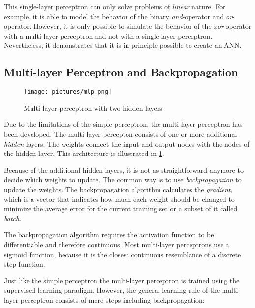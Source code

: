 This single-layer perceptron can only solve problems of \textit{linear} nature. For example, it is able to model the behavior of the binary \textit{and}-operator and \textit{or}-operator. However, it is only possible to simulate the behavior of the \textit{xor} operator with a multi-layer perceptron and not with a single-layer perceptron. Nevertheless, it demonstrates that it is in principle possible to create an \ac{ANN}.
\cite{haykin2009neural}

\subsection*{Multi-layer Perceptron and Backpropagation}
\begin{figure}[ht]
    \centering 
    \texttt{[image: pictures/mlp.png]}
    \caption{Multi-layer perceptron with two hidden layers \cite{nielsen2015neural}}
    \label{pic:mlp}    %
\end{figure}
Due to the limitations of the simple perceptron, the multi-layer perceptron has been developed. The multi-layer percepton consists of one or more additional \textit{hidden} layers. The weights connect the input and output nodes with the nodes of the hidden layer. This architecture is illustrated in \cref{pic:mlp}.

Because of the additional hidden layers, it is not as straightforward anymore to decide which weights to update. The common way is to use \textit{backpropagation} to update the weights. The backpropagation algorithm calculates the \textit{gradient}, which is a vector that indicates how much each weight should be changed to minimize the average error for the current training set or a subset of it called \textit{batch}.
\cite{nielsen2015neural,hochreiter2001gradient}

The backpropagation algorithm requires the activation function to be differentiable and therefore continuous. Most multi-layer perceptrons use a sigmoid function, because it is the closest continuous resemblance of a discrete step function.
\cite{haykin2009neural,nielsen2015neural}

Just like the simple perceptron the multi-layer perceptron is trained using the supervised learning paradigm. However, the general learning rule of the multi-layer perceptron consists of more steps including backpropagation:


